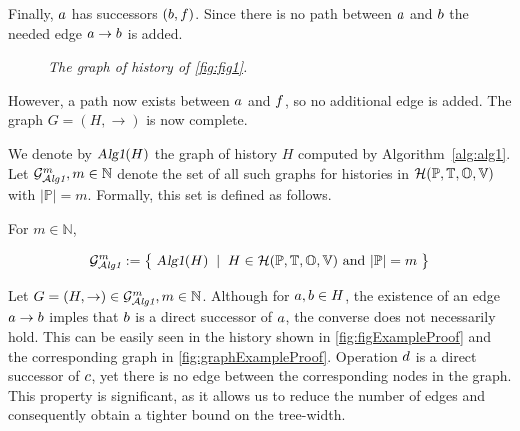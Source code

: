 \documentclass[12pt]{article}
\begin{document}
\begin{example}
Finally, $a$ has successors $(b,f)$. Since there is no path between $a$ and $b$ the needed edge $a\rightarrow b$ is added. 

\begin{figure}[H]
\begin{center}
\end{center}
\caption{\small \slshape The graph of history of \autoref{fig:fig1}.}
\label{fig:fig2}
\end{figure}

However, a path now exists between $a$ and $f$, so no additional edge is added. The graph $G=(H,\rightarrow)$ is now complete.

\end{example}

\vspace{2em}

We denote by $\textsl{Alg1}(H)$ the graph of history $H$ computed by Algorithm~\ref{alg:alg1}. Let $\mathcal{G}_{\mathcal{A}\emph{lg1}}^m,m\in\mathbb{N}$ denote the set of all such graphs for histories in  $\mathcal{H}(\mathbb{P}, \mathbb{T}, \mathbb{O}, \mathbb{V})$ with $|\mathbb{P}|= m $. Formally, this set is defined as follows.

\begin{nameddefinition}
For $m\in\mathbb{N}$,

\[
\mathcal{G}_{\mathcal{A}\emph{lg1}}^m:=\big\{\;  \textsl{Alg1}(H) \;\mid \;H \in \mathcal{H}(\mathbb{P}, \mathbb{T}, \mathbb{O}, \mathbb{V}) \text{ and }|\mathbb{P}|= m  \;\big\}
\]

\end{nameddefinition}


\vspace{1em}

Let $G=(H,\rightarrow)\in\mathcal{G}_{\mathcal{A}\emph{lg1}}^m,m\in\mathbb{N}$. Although for $a,b\in H$, the existence of an edge $a\rightarrow b$ imples that $b$ is a direct successor of $a$, the converse does not necessarily hold.
 This can be easily seen in the history shown in \autoref{fig:figExampleProof} and the corresponding graph in \autoref{fig:graphExampleProof}. Operation $d$ is a direct successor of $c$, yet there is no edge between the corresponding nodes in the graph. This property is significant, as it allows us to reduce the number of edges and consequently obtain a tighter bound on the tree-width.
 
\end{document}
